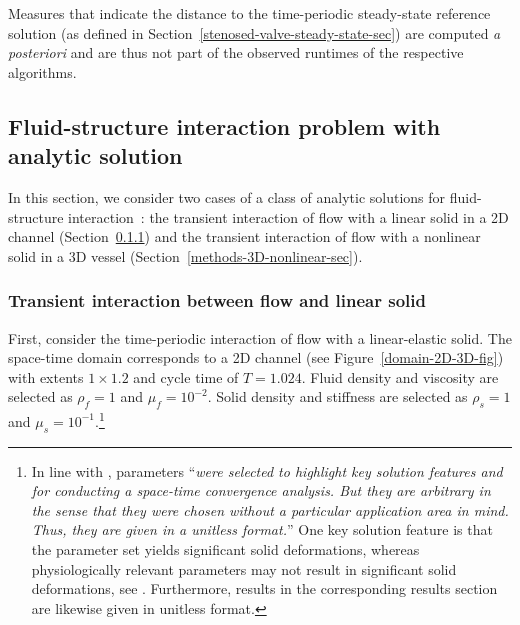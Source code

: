 \documentclass[3p]{elsarticle}
\begin{document}
Measures that indicate the distance to the time-periodic steady-state reference solution
(as defined in Section~\ref{stenosed-valve-steady-state-sec})
are computed \emph{a posteriori} and are thus not part of the observed runtimes
of the respective algorithms.
\subsection{Fluid-structure interaction problem with analytic solution}
\label{analytic-fsi-sec}
In this section, we consider two cases of a class of analytic solutions
for fluid-structure interaction~\cite{HessenthalerBalmusRoehrleNordsletten2020}:
the transient interaction of flow with a linear solid
in a 2D channel (Section~\ref{methods-2D-linear-sec})
and the transient interaction of flow with a nonlinear solid
in a 3D vessel (Section~\ref{methods-3D-nonlinear-sec}).
\subsubsection{Transient interaction between flow and linear solid}
\label{methods-2D-linear-sec}
First, consider the time-periodic interaction of flow with a linear-elastic solid.
The space-time domain corresponds to a 2D channel (see Figure~\ref{domain-2D-3D-fig})
with extents $1 \times 1.2$ and cycle time of $T = 1.024$.
Fluid density and viscosity are selected as $\rho_f = 1$ and $\mu_f = 10^{-2}$.
Solid density and stiffness are selected as $\rho_s = 1$ and $\mu_s = 10^{-1}$.\footnote{In line
with \cite[Section 5.1]{HessenthalerBalmusRoehrleNordsletten2020},
parameters ``\emph{were selected to highlight key solution features
and for conducting a space-time convergence analysis.
But they are arbitrary in the sense that they were chosen
without a particular application area in mind. Thus, they are given in a unitless format.}''
One key solution feature is that the parameter set yields significant solid deformations,
whereas physiologically relevant parameters may not result in significant solid deformations,
see \cite[Section 5.3]{HessenthalerBalmusRoehrleNordsletten2020}.
Furthermore, results in the corresponding results section are likewise given in unitless format.}
\end{document}
